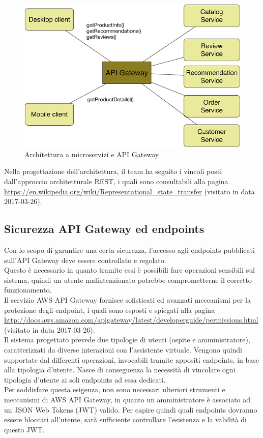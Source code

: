 \begin{figure}[h]
	\centering
	\includegraphics[width=\textwidth,height=\textheight,keepaspectratio,scale=0.1]{images/apigateway1.png}
	\caption{Architettura a microservizi e API Gateway}\label{fig:apig1}
\end{figure}
\newpage
Nella progettazione dell'architettura, il team ha seguito i vincoli posti dall'approccio architetturale REST, i quali sono consultabili alla pagina \url{https://en.wikipedia.org/wiki/Representational_state_transfer} (visitato in data 2017-03-26).
\subsection{Sicurezza API Gateway ed endpoints}
Con lo scopo di garantire una certa sicurezza, l'accesso agli endpoints pubblicati sull'API Gateway deve essere controllato e regolato. \\Questo è necessario in quanto tramite essi è possibili fare operazioni sensibili sul sistema, quindi un utente malintenzionato potrebbe comprometterne il corretto funzionamento.\\ 
Il servizio AWS API Gateway fornisce sofisticati ed avanzati meccanismi per la protezione degli endpoint, i quali sono esposti e spiegati alla pagina \url{http://docs.aws.amazon.com/apigateway/latest/developerguide/permissions.html} (visitato in data 2017-03-26). \\

Il sistema progettato prevede due tipologie di utenti (ospite e amministratore), caratterizzati da diverse interazioni con l'assistente virtuale. Vengono quindi supportate dal  differenti operazioni, invocabili tramite appositi endpoints, in base alla tipologia d'utente. Nasce di conseguenza la necessità di vincolare ogni tipologia d'utente ai soli endpoints ad essa dedicati. \\
Per soddisfare questa esigenza, non sono necessari ulteriori strumenti e meccanismi di AWS API Gateway, in quanto un amministratore è associato ad un JSON Web Tokens (JWT) valido. Per capire quindi quali endpoints dovranno essere bloccati all'utente, sarà sufficiente controllare l'esistenza e la validità di questo JWT.

